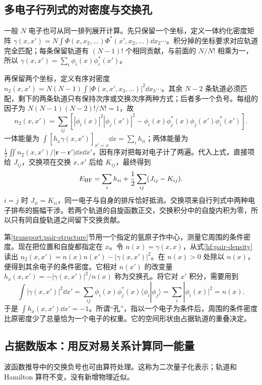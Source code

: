 \subsection{多电子行列式的对密度与交换孔}
一般 $N$ 电子也可从同一排列展开计算。先只保留一个坐标，定义一体约化密度矩阵 $\gamma(x,x')=N\int\Phi(x,x_2,\ldots)\Phi^*(x',x_2,\ldots)\dd x_2\cdots$。积分掉的坐标要求对应轨道完全匹配；每条保留轨道有 $(N-1)!$ 个相同贡献，与前面的 $N/N!$ 相乘为一，所以 $\gamma(x,x')=\sum_i\phi_i(x)\phi_i^*(x')$。

再保留两个坐标，定义有序对密度 $n_2(x,x')=N(N-1)\int|\Phi(x,x',x_3,\ldots)|^2\dd x_3\cdots$。其余 $N-2$ 条轨道必须匹配，剩下的两条轨道只有保持次序或交换次序两种方式；后者多一个负号。每组的因子为 $N(N-1)(N-2)!/N!=1$，故
\begin{equation}\label{hf:pair-density}
n_2(x,x')=\sum_{ij}\left[
|\phi_i(x)|^2|\phi_j(x')|^2
-\phi_i(x)\phi_j^*(x)\phi_j(x')\phi_i^*(x')\right].
\end{equation}
一体能量为 $\int[\hat h_x\gamma(x,x')]_{x'=x}\dd x=\sum_i h_{ii}$；两体能量为 $\tfrac12\iint n_2(x,x')/|\bm r-\bm r'|\dd x\dd x'$，因有序对把每对电子计了两遍。代入上式，直接项给 $J_{ij}$，交换项在交换 $x,x'$ 后给 $K_{ij}$，最终得到
\begin{equation}\label{hf:energy}
E_{\rm HF}=\sum_i h_{ii}+\frac12\sum_{ij}(J_{ij}-K_{ij}).
\end{equation}
$i=j$ 时 $J_{ii}=K_{ii}$，同一电子与自身的排斥恰好抵消。交换项来自行列式中两种电子排布的振幅干涉。若两个轨道的自旋函数正交，交换积分中的自旋内积为零，所以只有同自旋轨道之间留下交换贡献。

第\ref{transport:pair-structure}节用一个指定的氩原子作中心，测量它周围的条件密度。现在把位置和自旋都指定在 $x$。令 $n(x)=\gamma(x,x)$，从式\eqref{hf:pair-density}读出 $n_2(x,x')=n(x)n(x')-|\gamma(x,x')|^2$。在 $n(x)>0$ 处除以 $n(x)$，便得到其余电子的条件密度。它相对 $n(x')$ 的改变量 $h_x(x,x')=-|\gamma(x,x')|^2/n(x)$ 称为交换孔。将它对 $x'$ 积分，需要用到
\begin{equation}
\int|\gamma(x,x')|^2\dd x'
=\sum_{ij}\phi_i(x)\phi_j^*(x)\langle\phi_i|\phi_j\rangle
=\sum_i|\phi_i(x)|^2=n(x).
\end{equation}
于是 $\int h_x(x,x')\dd x'=-1$。所谓“孔”，指以一个电子为条件后，周围的条件密度比原密度少了总量恰为一个电子的权重。它的空间形状由占据轨道的重叠决定。

\subsection{占据数版本：用反对易关系计算同一能量}\label{hf:occupation-representation}
波函数推导中的交换负号也可由算符处理。这称为二次量子化表示；轨道和 Hamilton 算符不变，没有新增物理近似。

